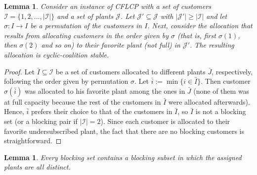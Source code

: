 \documentclass[preprint,11pt,authoryear]{elsarticle}
\def\J{\mathcal{J}}
\def\I{\mathcal{I}}
\newtheorem{lemma}[theorem]{Lemma}
\begin{document}
\begin{lemma} \label{lem:permutation}
 Consider an instance of {\rm CFLCP} with a set of customers $\I=\{1,2,\dots,|\I|\}$ and a set of plants $\J$. Let $\J' \subseteq \J$ with $|\J'| \ge |\I|$ and let $\sigma: I \rightarrow I$ be a permutation of the customers in $I$. Next, consider the allocation that results from allocating customers in the order given by $\sigma$ (that is, first $\sigma(1)$, then $\sigma(2)$ and so on) to their favorite plant (not full) in $\J'$. The resulting allocation is cyclic-coalition stable.   
\end{lemma}
\begin{proof}
 Let $\bar{I}\subseteq \I$ be a set of customers allocated to different plants $\bar{J}$, respectively, following the order given by permutation $\sigma$. Let $\bar{i}:= \min  \{i\in \bar{I}\}$. Then customer $\sigma(\bar{i})$ was allocated to his favorite plant among the ones in $\bar{J}$ (none of them was at full capacity because the rest of the customers in $\bar{I}$ were allocated afterwards). Hence, $\bar{i}$ prefers their choice to that of the customers in $\bar{I}$, so $\bar{I}$ is not a blocking set (or a blocking pair if $|\I|=2$). Since each customer is allocated to their favorite undersubscribed plant, the fact that there are no blocking customers is straightforward.
\end{proof}

\begin{lemma}
Every blocking set contains a blocking subset in which the assigned plants are all distinct.
\end{lemma}
\end{document}
